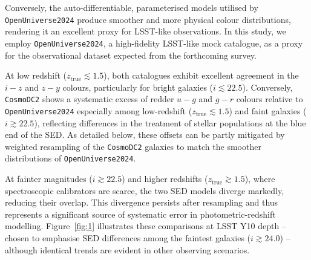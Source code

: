 Conversely, the auto-differentiable, parameterised models utilised by \texttt{OpenUniverse2024} produce smoother and more physical colour distributions, rendering it an excellent proxy for LSST-like observations. In this study, we employ \texttt{OpenUniverse2024}, a high-fidelity LSST-like mock catalogue, as a proxy for the observational dataset expected from the forthcoming survey.

At low redshift (\(z_{\mathrm{true}} \lesssim 1.5\)), both catalogues exhibit excellent agreement in the \(i - z\) and \(z - y\) colours, particularly for bright galaxies (\(i \lesssim 22.5\)). Conversely, \texttt{CosmoDC2} shows a systematic excess of redder \(u - g\) and \(g - r\) colours relative to \texttt{OpenUniverse2024} especially among low-redshift (\(z_{\mathrm{true}} \lesssim 1.5\)) and faint galaxies (\(i \gtrsim 22.5\)), reflecting differences in the treatment of stellar populations at the blue end of the SED. As detailed below, these offsets can be partly mitigated by weighted resampling of the \texttt{CosmoDC2} galaxies to match the smoother distributions of \texttt{OpenUniverse2024}. 

At fainter magnitudes (\(i \gtrsim 22.5\)) and higher redshifts (\(z_{\mathrm{true}} \gtrsim 1.5\)), where spectroscopic calibrators are scarce, the two SED models diverge markedly, reducing their overlap. This divergence persists after resampling and thus represents a significant source of systematic error in photometric-redshift modelling. Figure~\ref{fig:1} illustrates these comparisons at LSST Y10 depth -- chosen to emphasise SED differences among the faintest galaxies (\(i\gtrsim24.0\)) -- although identical trends are evident in other observing scenarios.